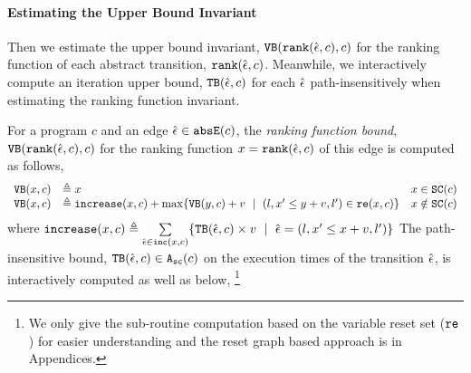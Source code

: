  \paragraph{Estimating the Upper Bound Invariant}
Then we estimate the upper bound invariant,  ${\mathtt{VB}}(\mathtt{rank}(\hat{\mathtt{\epsilon}{}}, c), c)$ for the ranking function of each abstract transition, $\mathtt{rank}(\hat{\mathtt{\epsilon}{}}, c)$. Meanwhile, we interactively compute an iteration upper bound,  ${\mathtt{TB}}(\hat{\mathtt{\epsilon}{}}, c)$  for each $\hat{\mathtt{\epsilon}{}}$ path-insensitively when estimating the ranking function invariant.
\begin{defn}
  \label{def:ranking_bound}
For a program $c$ and an edge $\hat{\mathtt{\epsilon}{}} \in \mathtt{abs}{\mathtt{E}}(c)$,
the \emph{ranking function bound}, 
${\mathtt{VB}}(\mathtt{rank}(\hat{\mathtt{\epsilon}{}}, c), c)$ for the ranking function $x = \mathtt{rank}(\hat{\mathtt{\epsilon}{}}, c)$
of this edge
is computed as follows,
{\small
  \[ 
\begin{array}{lll}
  \varinvar(x, c) & \triangleq x & x \in \scvar(c) \\
  \varinvar(x, c) & \triangleq \incrs(x, c) + \max\left\{\varinvar(y, c) + v ~\mid~ (l, x' \leq y + v, l') \in \reset(x, c) \right\} & x \notin \scvar(c)
\end{array}
\]
}
%
where $\mathtt{increase}(x, c) \triangleq \sum\limits_{\hat{\mathtt{\epsilon}{}} \in \mathtt{inc}(x, c)}\{{\mathtt{TB}}(\hat{\mathtt{\epsilon}{}}, c) \times v ~\mid~ \hat{\mathtt{\epsilon}{}} = (l, x' \leq x + v, l')\}$
The path-insensitive bound, ${\mathtt{TB}}(\hat{\mathtt{\epsilon}{}}, c) \in {\ensuremath{\mathtt{A_{sc}}}}(c)$  on the execution times of the transition $\hat{\mathtt{\epsilon}{}}$, is interactively computed as well as below,
\footnote{We only give the sub-routine computation based on the variable reset set ($\mathtt{re}$) for  easier understanding
and the reset graph based approach is in Appendices.
}
{\small
}
\end{defn}
